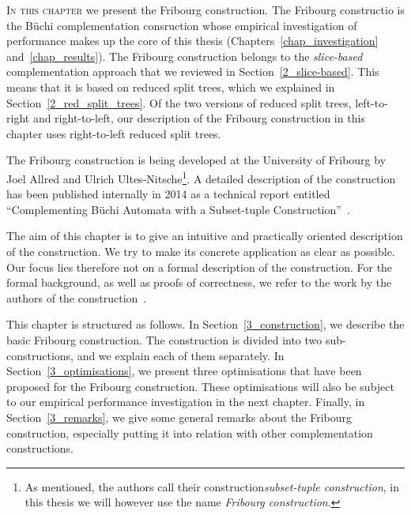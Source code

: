 \lettrine{I}{n this chapter} we present the Fribourg construction. The Fribourg constructio  is the Büchi complementation consruction whose empirical investigation of performance makes up the core of this thesis (Chapters~\ref{chap_investigation} and~\ref{chap_results}). The Fribourg construction belongs to the \textit{slice-based} complementation approach that we reviewed in Section~\ref{2_slice-based}. This means that it is based on reduced split trees, which we explained in Section~\ref{2_red_split_trees}. Of the two versions of reduced split trees, left-to-right and right-to-left, our description of the Fribourg construction in this chapter uses right-to-left reduced split trees.

The Fribourg construction is being developed at the University of Fribourg by Joel Allred and Ulrich Ultes-Nitsche\footnote{As mentioned, the authors call their construction\textit{subset-tuple construction}, in this thesis we will however use the name \textit{Fribourg construction}.}. A detailed description of the construction has been published internally in 2014 as a technical report entitled ``Complementing Büchi Automata with a Subset-tuple Construction''~\cite{2014_joel_ulrich}.

The aim of this chapter is to give an intuitive and practically oriented description of the construction. We try to make its concrete application as clear as possible. Our focus lies therefore not on a formal description of the construction. For the formal background, as well as proofs of correctness, we refer to the work by the authors of the construction~\cite{2014_joel_ulrich}.

This chapter is structured as follows. In Section~\ref{3_construction}, we describe the basic Fribourg construction. The construction is divided into two sub-constructions, and we explain each of them separately. In Section~\ref{3_optimisations}, we present three optimisations that have been proposed for the Fribourg construction. These optimisations will also be subject to our empirical performance investigation in the next chapter. Finally, in Section~\ref{3_remarks}, we give some general remarks about the Fribourg construction, especially putting it into relation with other complementation constructions.




